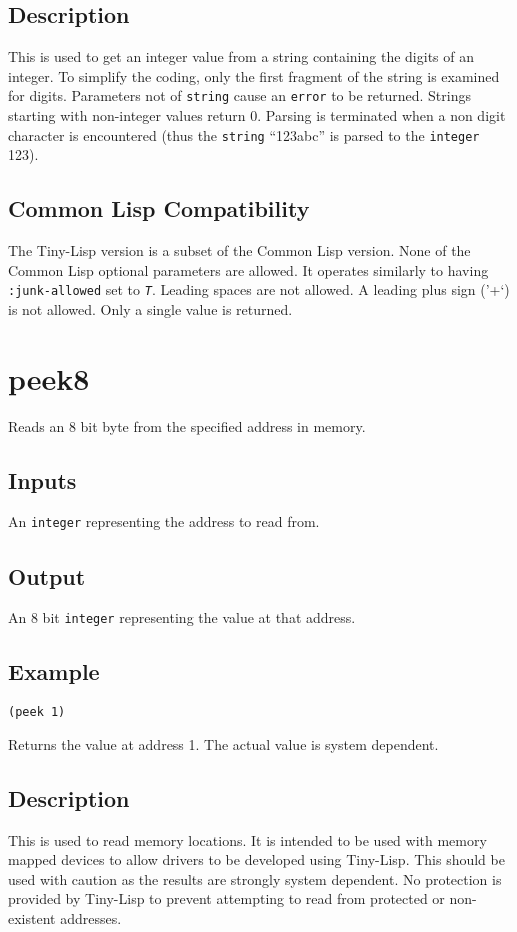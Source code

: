 \documentclass[10pt, openany]{book}
\newcommand{\constant}[1]{\emph{\texttt{#1}}}
\newcommand{\keyword}[1]{\texttt{#1}}
\newcommand{\datatype}[1]{\texttt{#1}}
\newcommand{\tl}{Tiny-Lisp}
\newcommand{\cl}{Common Lisp}
\begin{document}
\subsection{Description}
This is used to get an integer value from a string containing the digits of an integer.  To simplify the coding, only the first fragment of the string is examined for digits.  Parameters not of \datatype{string} cause an \keyword{error} to be returned.  Strings starting with non-integer values return 0.  Parsing is terminated when a non digit character is encountered (thus the \datatype{string} ``123abc'' is parsed to the \datatype{integer} 123).
\subsection{Common Lisp Compatibility}
The \tl{} version is a subset of the \cl{} version.  None of the \cl{} optional parameters are allowed.  It operates similarly to having \keyword{:junk-allowed} set to \constant{T}. Leading spaces are not allowed.  A leading plus sign ('+`) is not allowed.  Only a single value is returned.

\section{peek8}
Reads an 8 bit byte from the specified address in memory.
\subsection{Inputs}
An \datatype{integer} representing the address to read from.
\subsection{Output}
An 8 bit \datatype{integer} representing the value at that address.
\subsection{Example}
\begin{lstlisting}
(peek 1)
\end{lstlisting}
Returns the value at address 1.  The actual value is system dependent.
\subsection{Description}
This is used to read memory locations.  It is intended to be used with memory mapped devices to allow drivers to be developed using \tl{}.  This should be used with caution as the results are strongly system dependent.  No protection is provided by \tl{} to prevent attempting to read from protected or non-existent addresses.
\end{document}
